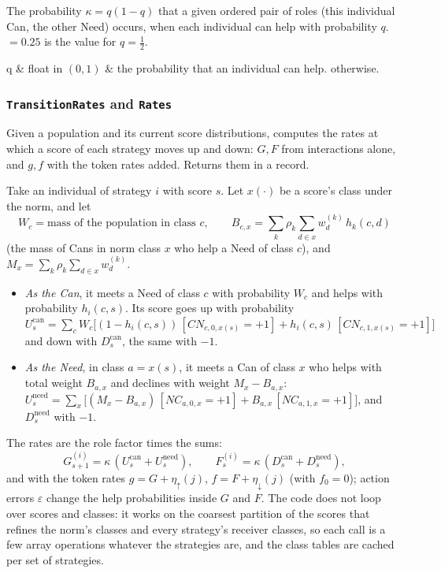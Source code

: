 \whatit
The probability $\kappa=q(1-q)$ that a given ordered pair of roles (this individual Can, the other Need) occurs, when each
individual can help with probability $q$. ${}=0.25$ is the value for $q=\tfrac12$.

\paramsh
\begin{params}
q & float in $(0,1)$ & the probability that an individual can help.  otherwise.\\
\end{params}

\subsubsection{\texttt{TransitionRates} and \texttt{Rates}}

\whatit
Given a population and its current score distributions, computes the rates at which a score of each strategy moves up and
down: $G,F$ from interactions alone, and $g,f$ with the token rates added. Returns them in a  record.

\howit
Take an individual of strategy $i$ with score $s$. Let $x(\cdot)$ be a score's class under the norm, and let
\[
 W_c=\text{mass of the population in class } c,\qquad
 B_{c,x}=\sum_k\rho_k\sum_{d\in x} w^{(k)}_d\,h_k(c,d)
\]
(the mass of Cans in norm class $x$ who help a Need of class $c$), and $M_x=\sum_k\rho_k\sum_{d\in x}w^{(k)}_d$.
\begin{itemize}
\item \emph{As the Can}, it meets a Need of class $c$ with probability $W_c$ and helps with probability $h_i(c,s)$. Its
score goes up with probability
$U^{\mathrm{can}}_s=\sum_c W_c\bigl[(1-h_i(c,s))\,[CN_{c,0,x(s)}=+1]+h_i(c,s)\,[CN_{c,1,x(s)}=+1]\bigr]$ and down with $D^{\mathrm{can}}_s$,
the same with $-1$.
\item \emph{As the Need}, in class $a=x(s)$, it meets a Can of class $x$ who helps with total weight $B_{a,x}$ and declines
with weight $M_x-B_{a,x}$:
$U^{\mathrm{need}}_s=\sum_x\bigl[(M_x-B_{a,x})\,[NC_{a,0,x}=+1]+B_{a,x}\,[NC_{a,1,x}=+1]\bigr]$, and $D^{\mathrm{need}}_s$ with $-1$.
\end{itemize}
The rates are the role factor times the sums:
\[
 G^{(i)}_{s+1}=\kappa\,(U^{\mathrm{can}}_s+U^{\mathrm{need}}_s),\qquad
 F^{(i)}_{s}=\kappa\,(D^{\mathrm{can}}_s+D^{\mathrm{need}}_s),
\]
and with the token rates $g=G+\eta_\uparrow(j)$, $f=F+\eta_\downarrow(j)$ (with $f_0=0$); action errors $\varepsilon$ change the help
probabilities inside $G$ and $F$. The code does not loop over scores and classes: it works on the coarsest partition of the scores that
refines the norm's classes and every strategy's receiver classes, so each call is a few array operations whatever the
strategies are, and the class tables are cached per set of strategies.

